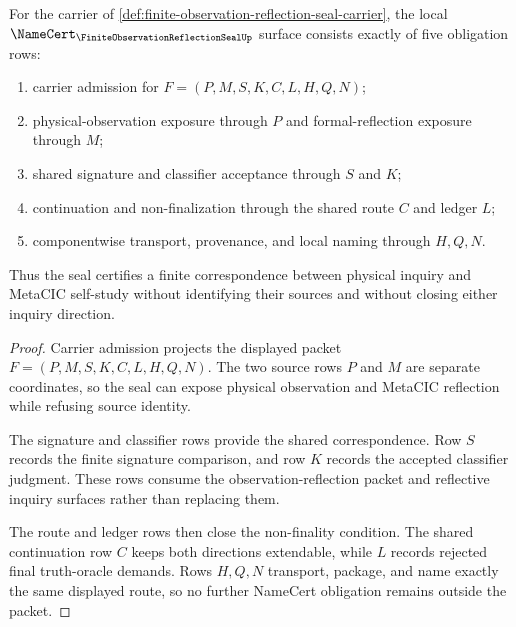 \begin{theorem}
\label{thm:finite-observation-reflection-seal-namecert-obligations}
For the carrier of \autoref{def:finite-observation-reflection-seal-carrier}, the local $\NameCert_{\FiniteObservationReflectionSealUp}$ surface consists exactly of five obligation rows:
\begin{enumerate}
\item carrier admission for $F=(P,M,S,K,C,L,H,Q,N)$;
\item physical-observation exposure through $P$ and formal-reflection exposure through $M$;
\item shared signature and classifier acceptance through $S$ and $K$;
\item continuation and non-finalization through the shared route $C$ and ledger $L$;
\item componentwise transport, provenance, and local naming through $H,Q,N$.
\end{enumerate}
Thus the seal certifies a finite correspondence between physical inquiry and MetaCIC self-study without identifying their sources and without closing either inquiry direction.
\end{theorem}
\begin{proof}
Carrier admission projects the displayed packet $F=(P,M,S,K,C,L,H,Q,N)$. The two source rows $P$ and $M$ are separate coordinates, so the seal can expose physical observation and MetaCIC reflection while refusing source identity.

The signature and classifier rows provide the shared correspondence. Row $S$ records the finite signature comparison, and row $K$ records the accepted classifier judgment. These rows consume the observation-reflection packet and reflective inquiry surfaces rather than replacing them.

The route and ledger rows then close the non-finality condition. The shared continuation row $C$ keeps both directions extendable, while $L$ records rejected final truth-oracle demands. Rows $H,Q,N$ transport, package, and name exactly the same displayed route, so no further NameCert obligation remains outside the packet.
\end{proof}

